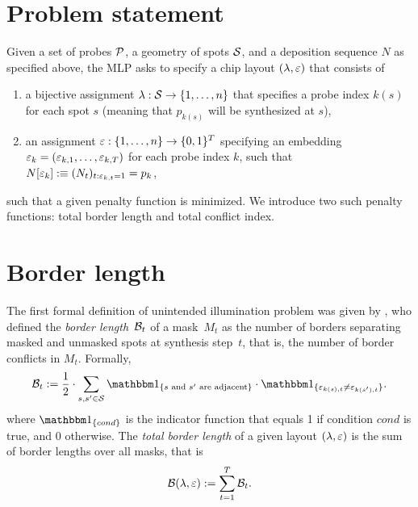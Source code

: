 \section{Problem statement}
\label{sec:mlp_problem}

Given a set of probes ${\mathcal{P}}$, a geometry of spots ${\mathcal{S}}$, and a deposition
sequence $N$ as specified above, the MLP asks to specify a chip layout
$(\lambda,\varepsilon)$ that consists of
\begin{enumerate}
\item a bijective assignment $\lambda: {\mathcal{S}}\to \{1,\dots,n\}$ that specifies a
  probe index $k(s)$ for each spot $s$ (meaning that $p_{k(s)}$ will be
  synthesized at $s$),
\item an assignment $\varepsilon: \{1,\dots,n\}\to \{0,1\}^T$ specifying an embedding
  $\varepsilon_k = (\varepsilon_{k,1},\dots,\varepsilon_{k,T})$ for each probe index $k$, such that
  $N[\varepsilon_k] :\equiv (N_t)_{t: \varepsilon_{k,t}=1} = p_k$,
\end{enumerate}
such that a given penalty function is minimized.  We introduce two such penalty
functions: total border length and total conflict index.


\section{Border length}
\label{sec:mlp_border_length}

The first formal definition of unintended illumination problem was given by
\citet{Hannenhalli2002}, who defined the \emph{border length}~${\mathcal{B}}_t$ of a
mask~$M_{t}$ as the number of borders separating masked and unmasked spots at
synthesis step~$t$, that is, the number of border conflicts in $M_{t}$.
Formally,
\begin{equation}
\label{eq:border_length}
  \CalB_t := \frac{1}{2} \cdot \sum_{s,s' \in \CalS}
    \Ind{s \text{ and } s' \text{ are adjacent}}
    \cdot \Ind{\eps_{k(s),t} \neq \eps_{k(s'),t}}.
\end{equation}
where $\Ind{cond}$ is the indicator function that equals 1 if condition $cond$
is true, and 0 otherwise. The \emph{total border length} of a given layout
$(\lambda,\varepsilon)$ is the sum of border lengths over all masks, that is
\begin{equation}
\label{eq:total_border_length}
  {\mathcal{B}}(\lambda,\varepsilon) := \sum_{t=1}^{T} {\mathcal{B}}_t.
\end{equation}

